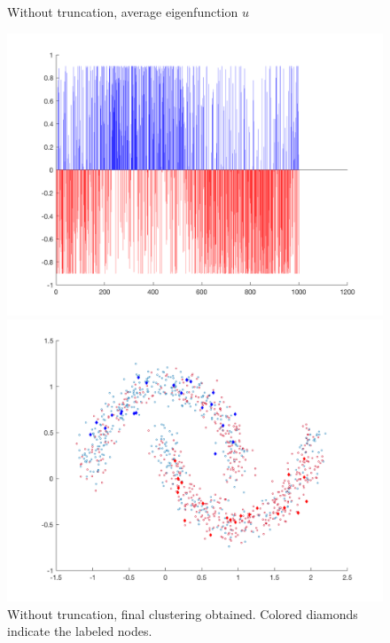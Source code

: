\documentclass{siamart1116}
\begin{document}
\begin{figure}[!htb]
    \begin{minipage}{0.48\textwidth}
        \centering
        \caption{\label{fig:moon_untruncated_avg} Without truncation, average eigenfunction $u$}
        \includegraphics[width=\linewidth]{graphics/moons/centered_untruncated/final_avg.png}
    \end{minipage} \hfill
    \begin{minipage}{0.48\textwidth}
        \centering
        \caption{\label{fig:moon_untruncated_scatter} Without truncation, final clustering obtained. Colored diamonds indicate the labeled nodes.}
        \includegraphics[width=\linewidth]{graphics/moons/centered_untruncated/final_scatter.png}
    \end{minipage}
\end{figure}
\end{document}
